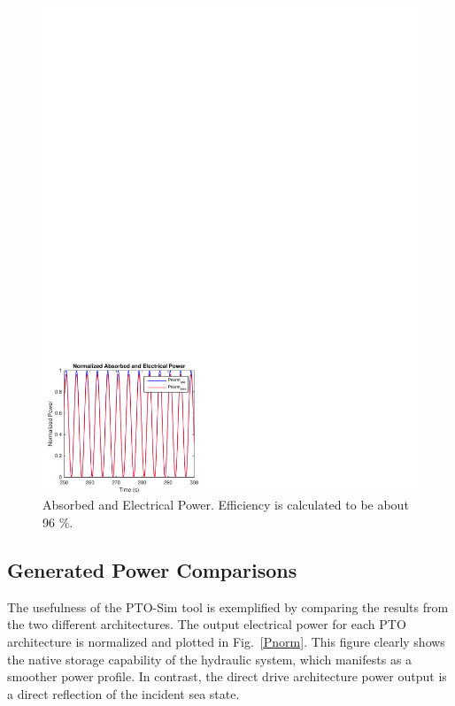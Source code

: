 \documentclass[twocolumn,10pt]{asme2e}
\begin{document}
\begin{figure}[t]
    \centering
    \includegraphics[width=1\columnwidth]{Images/normDDPabsPelec}
    \caption{Absorbed and Electrical Power. Efficiency is calculated to be about 96 \%.}
    \label{DDP}
    \end{figure}
    
    
\subsection*{Generated Power Comparisons}

The usefulness of the PTO-Sim tool is exemplified by comparing the results from the two different architectures. The output electrical power for each PTO architecture is normalized and plotted in Fig.~\ref{Pnorm}. This figure clearly shows the native storage capability of the hydraulic system, which manifests as a smoother power profile. In contrast, the direct drive architecture power output is a direct reflection of the incident sea state. 
\end{document}
